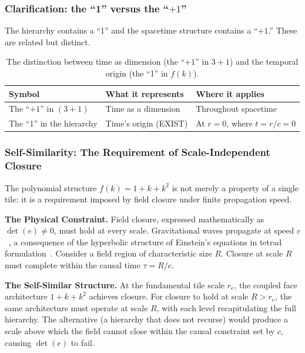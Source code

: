 \documentclass[aps,prd,preprint,superscriptaddress,showpacs,preprintnumbers,amsmath,amssymb,nofootinbib]{revtex4-2}
\begin{document}
\subsubsection*{Clarification: the ``1'' versus the ``$+1$''}

The hierarchy contains a ``1'' and the spacetime structure contains a ``$+1$.'' These are related but distinct.

\begin{table}[H]
\centering
\begin{tabular*}{0.95\textwidth}{@{\extracolsep{\fill}} lll @{}}
\toprule
\textbf{Symbol} & \textbf{What it represents} & \textbf{Where it applies} \\
\midrule
The ``$+1$'' in $(3{+}1)$ & Time as a dimension & Throughout spacetime \\
The ``1'' in the hierarchy & Time's origin (EXIST) & At $r = 0$, where $t = r/c = 0$ \\
\bottomrule
\end{tabular*}
\caption{The distinction between time as dimension (the ``$+1$'' in $3{+}1$) and the temporal origin (the ``1'' in $f(k)$).}
\label{tab:one-vs-plusone}
\end{table}

\subsubsection*{Self-Similarity: The Requirement of Scale-Independent Closure}

The polynomial structure $f(k) = 1 + k + k^2$ is not merely a property of a single tile: it is a requirement imposed by field closure under finite propagation speed.

\textbf{The Physical Constraint.}
Field closure, expressed mathematically as $\det(e) \neq 0$, must hold at every scale. Gravitational waves propagate at speed $c$~\cite{abbott2016}, a consequence of the hyperbolic structure of Einstein's equations in tetrad formulation~\cite{buchman2003}. Consider a field region of characteristic size $R$. Closure at scale $R$ must complete within the causal time $\tau = R/c$.

\textbf{The Self-Similar Structure.}
At the fundamental tile scale $r_e$, the coupled face architecture $1 + k + k^2$ achieves closure. For closure to hold at scale $R > r_e$, the same architecture must operate at scale $R$, with each level recapitulating the full hierarchy. The alternative (a hierarchy that does not recurse) would produce a scale above which the field cannot close within the causal constraint set by $c$, causing $\det(e)$ to fail.
\end{document}

